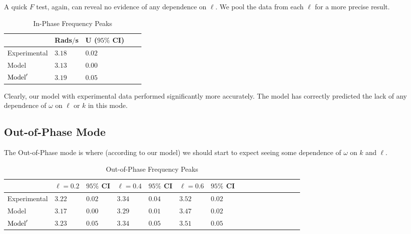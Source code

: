 \documentclass[aps,prl,reprint,10pt,amsmath,amssymb,superscriptaddress,a4paper, floatfix]{revtex4-2}
\begin{document}
A quick $F$ test, again, can reveal no evidence of any dependence on $\ell$. We pool the data from each $\ell$ for a more precise result.

\begin{table}[h]
    \begin{tabular}{@{}lllll@{}}
    \toprule
                            & Rads$/$s    & U ($95 \%$ CI)  & \\ \midrule
    Experimental            & $3.18$      & $0.02$          & \\ 
    Model                   & $3.13$      & $0.00$          & \\ 
    $\textnormal{Model}'$   & $3.19$      & $0.05$          & \\ \bottomrule
    \end{tabular}
 
    \caption{In-Phase Frequency Peaks}
\end{table}

Clearly, our model with experimental data performed significantly more accurately. The model has correctly predicted the lack of any dependence of $ \omega $ on $\ell$ or $k$ in this mode.

\subsection*{Out-of-Phase Mode}

The Out-of-Phase mode is where (according to our model) we should start to expect seeing some dependence of $\omega$ on $k$ and $\ell$.

\begin{table}[h]
\begin{tabular}{llllllllllllllll}
\toprule
                        & $\ell = 0.2$   & $95\%$ CI    & $\ell = 0.4$   & $95\%$ CI    & $\ell = 0.6$   & $95\%$ CI    & \\ \midrule
Experimental            & $3.22$         & $0.02$       & $3.34$         & $0.04$       & $3.52$         & $0.02$       & \\ 
Model                   & $3.17$         & $0.00$       & $3.29$         & $0.01$       & $3.47$         & $0.02$       & \\ 
$\textnormal{Model}'$   & $3.23$         & $0.05$       & $3.34$         & $0.05$       & $3.51$         & $0.05$       & \\ \bottomrule
\end{tabular}
\caption{Out-of-Phase Frequency Peaks}
\end{table}
\end{document}
